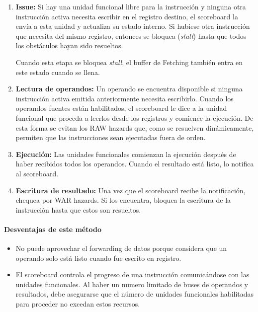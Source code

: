 \begin{enumerate}
	\item \textbf{Issue:} Si hay una unidad funcional libre para la instrucción y ninguna otra instrucción activa necesita escribir en el registro destino, el scoreboard la envía a esta unidad y actualiza su estado interno. Si hubiese otra instrucción que necesita del mismo registro, entonces se bloquea (\textit{stall}) hasta que todos los obstáculos hayan sido resueltos.
	
	Cuando esta etapa se bloquea \textit{stall}, el buffer de Fetching también entra en este estado cuando se llena.
	
	\item \textbf{Lectura de operandos:} Un operando se encuentra disponible si ninguna instrucción activa emitida anteriormente necesita escribirlo. Cuando los operandos fuentes están habilitados, el scoreboard le dice a la unidad funcional que proceda a leerlos desde los registros y comience la ejecución. De esta forma se  evitan los RAW hazards que, como se resuelven dinámicamente, permiten que las instrucciones sean ejecutadas fuera de orden.
	
	\item\textbf{Ejecución:} Las unidades funcionales comienzan la ejecución después de haber recibidos todos los operandos. Cuando el resultado está listo, lo notifica al scoreboard.
	
	\item\textbf{Escritura de resultado:} Una vez que el scoreboard recibe la notificación, chequea por WAR hazards. Si los encuentra, bloquea la escritura de la instrucción hasta que estos son resueltos.
\end{enumerate}

\paragraph{Desventajas de este método}
\begin{itemize}
	\item No puede aprovechar el forwarding de datos porque considera que un operando solo está listo cuando fue escrito en registro.
	\item El scoreboard controla el progreso de una instrucción comunicándose con las unidades funcionales. Al haber un numero limitado de buses de operandos y resultados, debe asegurarse que el número de unidades funcionales habilitadas para proceder no excedan estos recursos.
\end{itemize}
